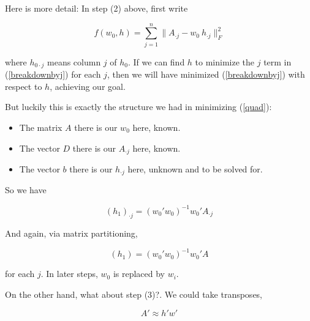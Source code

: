 Here is more detail:  In step (2) above, first write

\begin{equation}
\label{breakdownbyj}
f(w_0,h) = \sum_{j=1}^n
\|A_{\cdot j} - w_0 ~ h_{\cdot j}
\|_F^2
\end{equation}

where $h_{0 \cdot j}$ means column $j$ of $h_0$.  If we can find $h$ to
minimize the $j$ term in (\ref{breakdownbyj}) for each $j$, then we will
have minimized (\ref{breakdownbyj}) with respect to $h$, achieving our goal.

But luckily this is exactly the structure we had in minimizing
(\ref{quad}):

\begin{itemize}

\item The matrix $A$ there is our $w_0$ here, known.

\item The vector $D$ there is our $A_{\cdot j}$ here, known.

\item The vector $b$ there is our $h_{\cdot j}$ here, unknown and to be
solved for.

\end{itemize} 

So we have

\begin{equation}
(h_1)_{\cdot j} = (w_0'w_0)^{-1} w_0' A_{\cdot j}
\end{equation}

And again, via matrix partitioning,

\begin{equation}
\label{hfromw}
(h_1) = (w_0'w_0)^{-1} w_0' A
\end{equation}

for each $j$.  In later steps, $w_0$ is replaced by $w_i$.

% 


On the other hand, what about step (3)?.  We could take 
transposes,

\begin{equation}
A' \approx h' w'
\end{equation}

